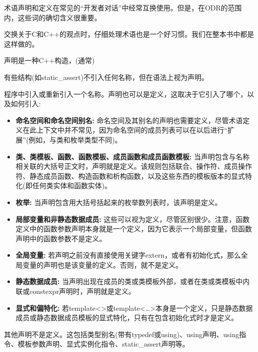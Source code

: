 术语声明和定义在常见的“开发者对话”中经常互换使用。但是，在ODR的范围内，这些词的确切含义很重要。

\begin{tcolorbox}[colback=webgreen!5!white,colframe=webgreen!75!black]
\hspace*{0.75cm}交换关于C和C++的观点时，仔细处理术语也是一个好习惯。我们在整本书中都是这样做的。
\end{tcolorbox}

声明是一种C++构造，(通常)

\begin{tcolorbox}[colback=webgreen!5!white,colframe=webgreen!75!black]
\hspace*{0.75cm}有些结构(如static\_assert)不引入任何名称，但在语法上视为声明。
\end{tcolorbox}

程序中引入或重新引入一个名称。声明也可以是定义，这取决于它引入了哪个，以及如何引入:

\begin{itemize}
\item 
\textbf{命名空间和命名空间别名: }
命名空间及其别名的声明也需要定义，尽管术语定义在此上下文中并不常见，因为命名空间的成员列表可以在以后进行“扩展”(例如，与类和枚举类型不同)。

\item 
\textbf{类、类模板、函数、函数模板、成员函数和成员函数模板: }
当声明包含与名称相关联的大括号正文时，声明就是定义。该规则包括联合、操作符、成员操作符、静态成员函数、构造函数和析构函数，以及这些东西的模板版本的显式特化(即任何类实体和函数实体)。

\item 
\textbf{枚举:}
当声明包含用大括号括起来的枚举数列表时，该声明是定义。

\item 
\textbf{局部变量和非静态数据成员:}
这些可以视为定义，尽管区别很少。注意，函数定义中的函数参数声明本身就是一个定义，因为它表示一个局部变量，但函数声明中的函数参数不是定义。

\item 
\textbf{全局变量:}
若声明之前没有直接使用关键字extern，或者有初始化式，那么全局变量的声明也是该变量的定义。否则，就不是定义。

\item 
\textbf{静态数据成员: }
当声明出现在成员的类或类模板外部，或者在类或类模板中内联或constexpr声明时，声明就是定义。

\item 
\textbf{显式和偏特化:}
若template<>或template<…>本身是一个定义，只是静态数据成员或静态数据成员模板的显式特化，只有在包含初始化式时才是定义。

\end{itemize}

其他声明不是定义。这包括类型别名(带有typedef或using)、using声明、using指令、模板参数声明、显式实例化指令、static\_assert声明等。






